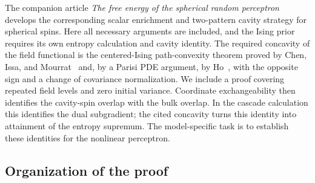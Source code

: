 The companion article \emph{The free energy of the spherical random
perceptron}~\cite{spherical} develops the corresponding scalar enrichment
and two-pattern cavity strategy for spherical spins. Here all necessary
arguments are included, and the Ising prior requires its own entropy
calculation and cavity identity. The required concavity of the field
functional is the centered-Ising path-convexity theorem proved by Chen,
Issa, and Mourrat~\cite[Proposition~2.2]{chenissamourrat2026} and, by a
Parisi PDE argument, by Ho~\cite[Theorem~1.8]{ho2026concavity}, with the
opposite sign and a change of covariance normalization. We include a proof
covering repeated field levels and zero initial variance. Coordinate
exchangeability then identifies the cavity-spin overlap with the bulk
overlap. In the cascade calculation this identifies the dual subgradient;
the cited concavity turns this identity into attainment of the entropy
supremum. The model-specific task is to establish these identities for
the nonlinear perceptron.

\subsection{Organization of the proof}

